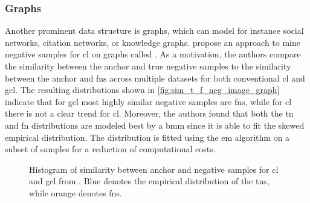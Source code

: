 \subsubsection{Graphs}\label{subsec:graph_distribution}

Another prominent data structure is graphs, which can model 
for instance social networks, citation networks, or knowledge graphs.
\citeauthor{progcl_2022} propose an approach to mine negative samples for \ac{cl} on graphs called \progcl{}. 
As a motivation, the authors compare the similarity between the anchor and true negative samples 
to the similarity between the anchor and \acp{fn} 
across multiple datasets for both conventional \ac{cl} and \ac{gcl}.
The resulting distributions shown in \autoref{fig:sim_t_f_neg_image_graph} 
indicate that for \ac{gcl} most highly similar negative samples are \acp{fn}, 
while for \ac{cl} there is not a clear trend for \ac{cl}.
Moreover, the authors found that both the \ac{tn} and \ac{fn} distributions are modeled best by a \ac{bmm} 
since it is able to fit the skewed empirical distribution.
The distribution is fitted using the \ac{em} algorithm on a subset of samples for a reduction of computational costs.

\begin{figure}%
    \centering
    \qquad
    \caption{Histogram of similarity between anchor and negative samples for \ac{cl} and \ac{gcl} from \citet{progcl_2022}.
    Blue denotes the empirical distribution of the \acp{tn}, while orange denotes \acp{fn}.}%
    \label{fig:sim_t_f_neg_image_graph}%
\end{figure}

